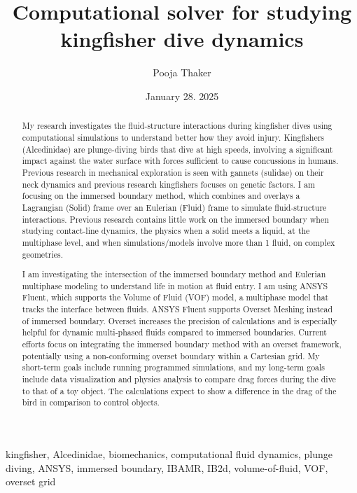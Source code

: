 \documentclass[12pt,conference,onecolumn]{IEEEtran}
\title{Computational solver for studying kingfisher dive dynamics }
\author{Pooja Thaker}
\date{January 28. 2025}
\newcommand{\keywords}{kingfisher, Alcedinidae, biomechanics, computational fluid dynamics, plunge diving, ANSYS, immersed boundary, IBAMR, IB2d, volume-of-fluid, VOF, overset grid}
\begin{document}
\maketitle 

\begin{abstract}
My research investigates the fluid-structure interactions during kingfisher dives using computational  simulations to understand better how they avoid injury. Kingfishers (Alcedinidae) are plunge-diving birds  that dive at high speeds, involving a significant impact against the water surface with forces sufficient  to cause concussions in humans. Previous research in mechanical exploration is seen with gannets (sulidae)  on their neck dynamics and previous research kingfishers focuses on genetic factors. I am focusing on the immersed boundary method, which combines and overlays a Lagrangian (Solid) frame over an Eulerian (Fluid)  frame to simulate fluid-structure interactions. Previous research contains little work on the immersed  boundary when studying contact-line dynamics, the physics when a solid meets a liquid, at the multiphase level, and when simulations/models involve more than 1 fluid, on complex geometries. 

I am investigating the intersection of the immersed boundary method and Eulerian multiphase modeling to understand life in motion at fluid entry. I am using ANSYS Fluent, which supports the Volume of Fluid (VOF)  model, a multiphase model that tracks the interface between fluids. ANSYS Fluent supports Overset Meshing  instead of immersed boundary. Overset increases the precision of calculations and is especially helpful  for dynamic multi-phased fluids compared to immersed boundaries. Current efforts focus on integrating the  immersed boundary method with an overset framework, potentially using a non-conforming overset boundary within a Cartesian grid. My short-term goals include running programmed simulations, and my long-term goals include data visualization and physics analysis to compare drag forces during the dive to that of a toy object. The calculations expect to show a difference in the drag of the bird in comparison to control objects.
\end{abstract}

\begin{IEEEkeywords}
\keywords
\end{IEEEkeywords}
\end{document}
